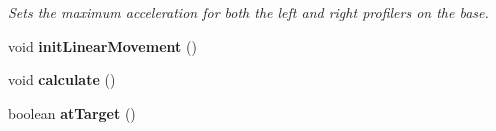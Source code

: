 \begin{DoxyCompactItemize}
\begin{DoxyCompactList}\small\item\em Sets the maximum acceleration for both the left and right profilers on the base. \end{DoxyCompactList}\item 
\mbox{\label{classfrc_1_1robot_1_1subsystems_1_1_base_a9612e8bb209ddeb9467f417a49c4721d}} 
void {\bfseries init\+Linear\+Movement} ()
\item 
\mbox{\label{classfrc_1_1robot_1_1subsystems_1_1_base_a0d9d00318b7799694b077fc9b2b37581}} 
void {\bfseries calculate} ()
\item 
\mbox{\label{classfrc_1_1robot_1_1subsystems_1_1_base_aad612a2c7d292d6128d4bca266c10cf8}} 
boolean {\bfseries at\+Target} ()
\end{DoxyCompactItemize}
